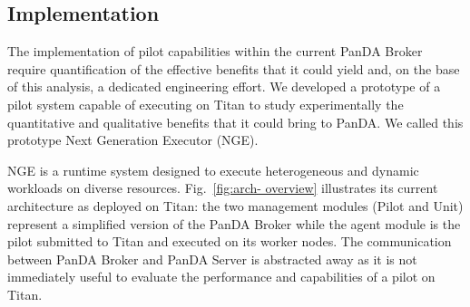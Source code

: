 


\subsection{Implementation}
\label{sec:arch}

The implementation of pilot capabilities within the current PanDA Broker require
quantification of the effective benefits that it could yield and, on the base of
this analysis, a dedicated engineering effort. We developed a prototype of a
pilot system capable of executing on Titan to study experimentally the
quantitative and qualitative benefits that it could bring to PanDA. We called
this prototype Next Generation Executor (NGE).


 NGE is a runtime system designed to execute
heterogeneous and dynamic workloads on diverse resources. Fig.~\ref{fig:arch-
overview} illustrates its current architecture as deployed on Titan: the two
management modules (Pilot and Unit) represent a simplified version of the PanDA Broker while
the agent module is the pilot submitted to Titan and executed on its worker
nodes. The communication between PanDA Broker and PanDA Server is abstracted
away as it is not immediately useful to evaluate the performance and
capabilities of a pilot on Titan.

